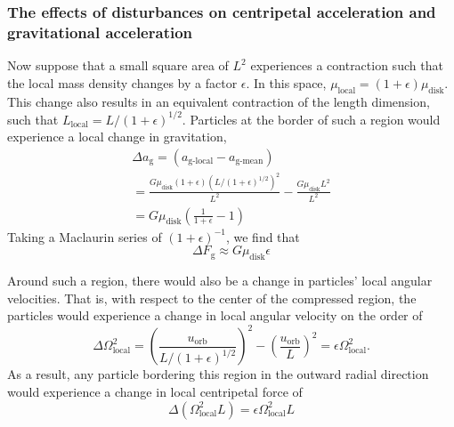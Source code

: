 \documentclass[aps,pra,twocolumn]{revtex4-1}
\begin{document}
\subsubsection{\label{section 3.1.1} The effects of disturbances on centripetal acceleration and gravitational acceleration}
Now suppose that a small square area of $L^2$ experiences a contraction such that the local mass density changes by a factor $\epsilon$.  In this space, $\mu_{\text{local}} = (1+\epsilon) \mu_{\text{disk}}$. This change also results in an equivalent contraction of the length dimension, such that $L_\text{local} = L/(1 + \epsilon)^{1/2}$. Particles at the border of such a region would experience a local change in gravitation,
\begin{multline}
\Delta a_{\text{g}} =(a_{\text{g-local}} - a_{\text{g-mean}}) \\
= \frac{G\mu_\text{disk} (1 + \epsilon) (L/(1 + \epsilon)^{1/2})^2}{L^2} - \frac{G\mu_{\text{disk}} L^2}{L^2}
\\
= G \mu_{\text{disk}}\left(\frac{1}{1 + \epsilon} - 1  \right) \nonumber
\end{multline}
Taking a Maclaurin series of $(1 + \epsilon)^{-1}$, we find that \cite{toomre1964}
\begin{equation}
\Delta F_\text{g} \approx G\mu_\text{disk}\epsilon
\end{equation}

Around such a region, there would also be a change in particles' local angular velocities.  That is, with respect to the center of the compressed region, the particles would experience a change in local angular velocity on the order of 
\begin{equation}
\Delta \Omega_\text{local}^2 = \left(\frac{u_\text{orb}}{L/(1+\epsilon)^{1/2}}\right)^2 - \left(\frac{u_\text{orb}}{L}\right)^2 =  \epsilon\Omega_\text{local}^2.
\end{equation}
As a result, any particle bordering this region in the outward radial direction would experience a change in local centripetal force of \cite{toomre1964}
\begin{equation}
\Delta (\Omega_\text{local}^2 L) = \epsilon \Omega_\text{local}^2 L
\end{equation}
\end{document}
